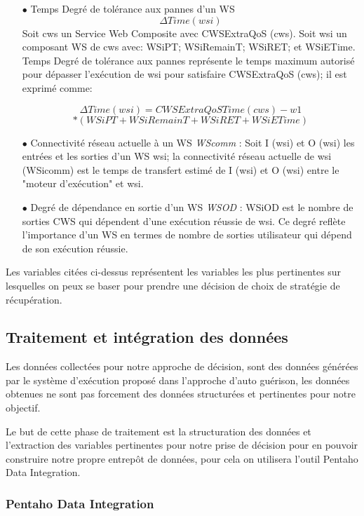 \begin{itemize}
\item [$\bullet$]Temps Degré de tolérance aux pannes d'un WS \textit{$$\Delta Time (wsi)$$} Soit cws un Service Web Composite avec CWSExtraQoS (cws). Soit wsi un composant WS de cws avec: WSiPT; WSiRemainT; WSiRET; et WSiETime. Temps Degré de tolérance aux pannes  représente le temps maximum autorisé pour dépasser l'exécution de wsi pour satisfaire CWSExtraQoS (cws); il est exprimé comme:


$$ \Delta Time(wsi) = CWSExtraQoSTime(cws) - w1 $$  $$ \ast(WSiPT + WSiRemainT + WSiRET +  WSiETime) $$



\item [$\bullet$] Connectivité réseau actuelle à un WS  \textit{WScomm} : Soit I (wsi) et O (wsi) les entrées et les sorties d'un WS wsi; la connectivité réseau actuelle de wsi (WSicomm) est le temps de transfert estimé de I (wsi) et O (wsi) entre le "moteur d'exécution" et wsi.

\item [$\bullet$] Degré de dépendance en sortie d'un WS  \textit{WSOD} : WSiOD est le nombre de sorties CWS qui dépendent d'une exécution réussie de wsi. Ce degré reflète l'importance d'un WS en termes de nombre de sorties utilisateur qui dépend de son exécution réussie.

\end{itemize}


Les variables citées ci-dessus représentent les variables les plus pertinentes sur lesquelles on peux se baser pour prendre une décision de choix de stratégie de récupération.

\subsection{Traitement et intégration des données }

Les données collectées pour notre approche de décision, sont des données générées par le système d'exécution proposé dans l'approche d'auto guérison, les données obtenues ne sont pas forcement des données structurées et pertinentes pour notre objectif. 

Le but de cette phase de traitement est la structuration des données et l'extraction des variables pertinentes pour notre prise de décision pour en pouvoir construire notre propre entrepôt de données, pour cela on utilisera l'outil Pentaho Data Integration. 

\subsubsection{Pentaho Data Integration }

